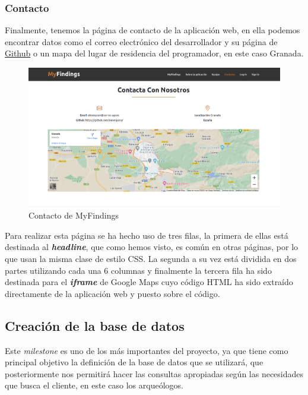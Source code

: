     \subsubsection{Contacto}
    Finalmente, tenemos la página de contacto de la aplicación web, en ella podemos
    encontrar datos como el correo electrónico del desarrollador y su página de
    \href{https://github.com/alexespana/}{Github} o un mapa del lugar de residencia del
    programador, en este caso Granada.\\

        \begin{figure}[H]
            \centering
            \includegraphics[scale=0.20]{imagenes/contact.png}
            \caption{Contacto de MyFindings}
            \label{fig:contact}
        \end{figure}

    Para realizar esta página se ha hecho uso de tres filas, la primera de ellas
    está destinada al \textbf{\textit{headline}}, que como hemos visto, es común en otras
    páginas, por lo que usan la misma clase de estilo CSS. La segunda a su vez está
    dividida en dos partes utilizando cada una 6 columnas y finalmente la tercera fila ha
    sido destinada para el \textbf{\textit{iframe}} de Google Maps cuyo código HTML ha sido
    extraído directamente de la aplicación web y puesto sobre el código.

\subsection{Creación de la base de datos}
Este \textit{milestone} es uno de los más importantes del proyecto, ya que tiene como
principal objetivo la definición de la base de datos que se utilizará, que posteriormente
nos permitirá hacer las consultas apropiadas según las necesidades que busca el cliente,
en este caso los arqueólogos.\\

